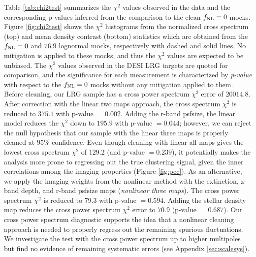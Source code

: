 Table \ref{tab:chi2test} summarizes the $\chi^{2}$ values observed in the data and the corresponding p-values inferred from the comparison to the clean $f_{\rm NL}=0$ mocks. Figure \ref{fig:chi2test} shows the $\chi^{2}$ histograms from the normalized cross spectrum (top) and mean density contrast (bottom) statistics which are obtained from the $f_{\rm NL}=0$ and $76.9$ lognormal mocks, respectively with dashed and solid lines. No mitigation is applied to these mocks, and thus the $\chi^{2}$ values are expected to be unbiased. The $\chi^{2}$ values observed in the DESI LRG targets are quoted for comparison, and the significance for each measurement is characterized by \textit{p-value} with respect to the $f_{\rm NL}=0$ mocks without any mitigation applied to them. Before cleaning, our LRG sample has a cross power spectrum $\chi^{2}$ error of $20014.8$. After correction with the linear two maps approach, the cross spectrum $\chi^{2}$ is reduced to $375.1$ with p-value $=0.002$. Adding the r-band psfsize, the linear model reduces the $\chi^{2}$ down to $195.9$ with p-value $=0.044$; however, we can reject the null hypothesis that our sample with the linear three maps is properly cleaned at $95\%$ confidence. Even though cleaning with linear all maps gives the lowest cross spectrum $\chi^{2}$ of $129.2$ (and p-value $=0.239$), it potentially makes the analysis more prone to regressing out the true clustering signal, given the inner correlations among the imaging properties (Figure \ref{fig:pcc}). As an alternative, we apply the imaging weights from the nonlinear method with the extinction, z-band depth, and r-band psfsize maps (\textit{nonlinear three maps}). The cross power spectrum $\chi^{2}$ is reduced to $79.3$ with p-value $=0.594$. Adding the stellar density map reduces the cross power spectrum $\chi^{2}$ error to $70.9$ (p-value $=0.687$). Our cross power spectrum diagnostic supports the idea that a nonlinear cleaning approach is needed to properly regress out the remaining spurious fluctuations. We investigate the test with the cross power spectrum up to higher multipoles but find no evidence of remaining systematic errors (see Appendix \ref{sec:scalesys}). 

